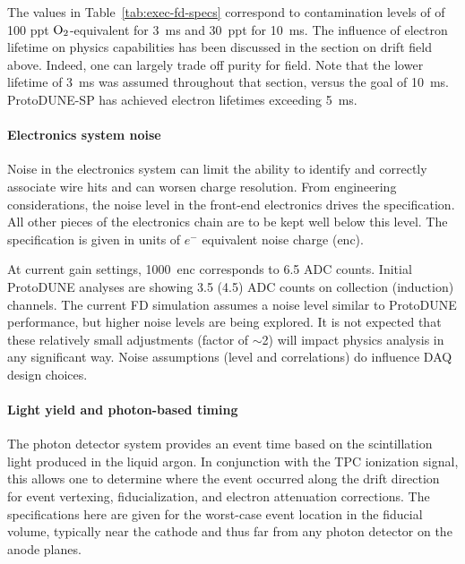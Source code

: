 The values in Table~\ref{tab:exec-fd-specs} correspond to 
contamination levels of of 100 ppt $\rm{O}_2$-equivalent 
for 3~ms and 30~ppt for 10~ms.  The influence of electron 
lifetime on physics capabilities has been discussed in the 
section on drift field above.  
Indeed, one can largely trade off purity for field. 
Note that the lower lifetime of 3~ms was assumed throughout 
that section, versus the goal of 10~ms.  ProtoDUNE-SP has achieved electron lifetimes exceeding 5~ms.

\paragraph{Electronics system noise}
Noise in the electronics system can 
limit the ability to identify and correctly associate wire hits 
and can worsen charge resolution.  From engineering
considerations, the noise level in the front-end electronics 
drives the specification.  All other pieces of the electronics 
chain are to be kept well below this level.  
The specification is given in units of $e^-$ equivalent 
noise charge (enc).

At current gain settings, 1000~enc corresponds 
to 6.5 ADC counts.  Initial ProtoDUNE analyses are 
showing 3.5 (4.5) ADC counts on collection (induction) channels. 
The current FD simulation assumes a noise level similar to 
ProtoDUNE performance, but higher noise levels are being 
explored.  It is not expected that these relatively small
adjustments (factor of $\sim$2) will impact physics analysis 
in any significant way.  Noise assumptions (level and 
correlations) do influence DAQ design choices.

\paragraph{Light yield and photon-based timing}
The photon detector system provides an event time 
based on the scintillation light produced in the liquid argon.  
In conjunction with the TPC ionization signal, this allows 
one to determine where the event occurred along 
the drift direction for event vertexing, fiducialization, 
and electron attenuation corrections.  The 
specifications here are given for the worst-case event 
location in the fiducial volume, typically near the cathode 
and thus far from any photon detector on the anode planes.

